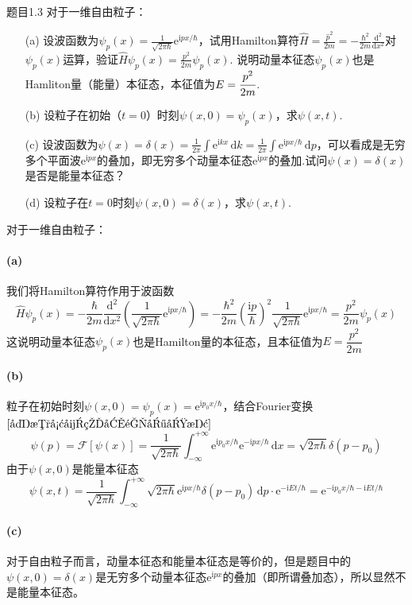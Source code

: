 \begin{question}{题目1.3}
    对于一维自由粒子：
    \begin{enumerate}
        \item[(a)] 设波函数为$\displaystyle \psi_p(x)=\frac{1}{\sqrt{2\pi\hbar}}\mathrm{e}^{\mathrm{i}px/\hbar}$，试用Hamilton算符$\displaystyle \hat{H}=\frac{\hat{p}^2}{2m}=-\frac{\hbar^2}{2m}\frac{\mathrm{d}^2}{\mathrm{d}x^2}$对$\psi_p(x)$运算，验证$\displaystyle \hat{H}\psi_p(x)=\frac{p^2}{2m}\psi_p(x)$. 说明动量本征态$\psi_p(x)$也是Hamliton量（能量）本征态，本征值为$\displaystyle E=\cfrac{p^2}{2m}$.
        \item[(b)] 设粒子在初始（$t=0$）时刻$\psi(x,0)=\psi_p(x)$，求$\psi(x,t)$.
        \item[(c)] 设波函数为$\displaystyle \psi(x)=\delta(x)=\frac{1}{2\pi}\int\mathrm{e}^{\mathrm{i}kx}\,\mathrm{d}k=\frac{1}{2\pi}\int\mathrm{e}^{\mathrm{i}px/\hbar}\,\mathrm{d}p$，可以看成是无穷多个平面波$\mathrm{e}^{\mathrm{i}px}$的叠加，即无穷多个动量本征态$\mathrm{e}^{\mathrm{i}px}$的叠加.试问$\psi(x)=\delta(x)$是否是能量本征态？
        \item[(d)] 设粒子在$t=0$时刻$\psi(x,0)=\delta(x)$，求$\psi(x,t)$.
    \end{enumerate}
\end{question}
\begin{solution}
    对于一维自由粒子：
    \paragraph{(a)} 我们将Hamilton算符作用于波函数
    $$
        \hat{H}\psi_p(x)
        =-\frac{\hbar}{2m}\frac{\mathrm{d}^2}{\mathrm{d}x^2}\left(\frac{1}{\sqrt{2\pi\hbar}}\mathrm{e}^{\mathrm{i}px/\hbar}\right)
        =-\frac{\hbar^2}{2m}\left(\frac{\mathrm{i}p}{\hbar}\right)^2 \frac{1}{\sqrt{2\pi\hbar}}\mathrm{e}^{\mathrm{i}px/\hbar}
        =\frac{p^2}{2m}\psi_p(x)
    $$
    这说明动量本征态$\psi_p(x)$也是Hamilton量的本征态，且本征值为$E=\dfrac{p^2}{2m}$

    \paragraph{(b)}粒子在初始时刻$\psi(x,0) = \psi_p(x) = \mathrm{e}^{\mathrm{i}p_0x/\hbar}$，结合Fourier变换$\eqref{复数形式的傅里叶变换}$
    $$
        \psi(p)=\mathcal{F}[\psi(x)]
        =\frac{1}{\sqrt{2\pi\hbar}}\int_{-\infty}^{+\infty}\mathrm{e}^{\mathrm{i}p_0x/\hbar}\mathrm{e}^{-\mathrm{i}px/\hbar}\,\mathrm{d}x
        =\sqrt{2\pi\hbar}\delta(p-p_0)
    $$
    由于$\psi(x,0)$是能量本征态
    $$
        \psi(x, t) = \frac{1}{\sqrt{2\pi\hbar}}\int_{-\infty}^{+\infty}\sqrt{2\pi\hbar}\mathrm{e}^{\mathrm{i}px/\hbar}\delta(p-p_0)\,\mathrm{d}p\cdot\mathrm{e}^{-\mathrm{i}Et/\hbar}
        =\mathrm{e}^{-\mathrm{i}p_0x/\hbar-\mathrm{i}Et/\hbar}
    $$

    \paragraph{(c)} 对于自由粒子而言，动量本征态和能量本征态是等价的，但是题目中的$\psi(x, 0)=\delta(x)$是无穷多个动量本征态$\mathrm{e}^{\mathrm{i}px}$的叠加（即所谓叠加态），所以显然不是能量本征态。
\end{solution}

